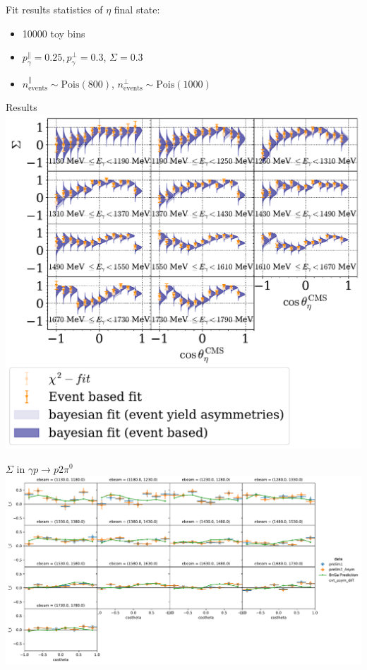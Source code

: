 \documentclass[11pt,aspectratio=169,dvipsnames]{beamer}
\begin{document}
	\begin{frame}{Fit results}
		statistics of $\eta$ final state:
		\begin{itemize}[label=$\blacktriangleright$]
			\item 10000 toy bins
			\item $p_\gamma^\parallel=0.25,p_\gamma^\bot=0.3$, $\Sigma=0.3$
			\item $n_\text{events}^\parallel\sim\text{Pois}(800)$, $n_\text{events}^\bot\sim\text{Pois}(1000)$ 
		\end{itemize}
	\end{frame}
	\begin{frame}{Results}
		\centering
		\includegraphics[width=.6\linewidth]{../../bayes/event_based_fit/plots/sigma_eta_alt.pdf}
	\end{frame}
	
	
	\begin{frame}{$\Sigma$ in $\gamma p \to p 2\pi^0$}
		\includegraphics[width=\linewidth]{../../figs/hydrogen/asymmetry/2pi0_prelim.pdf}
	\end{frame}
	
\end{document}
